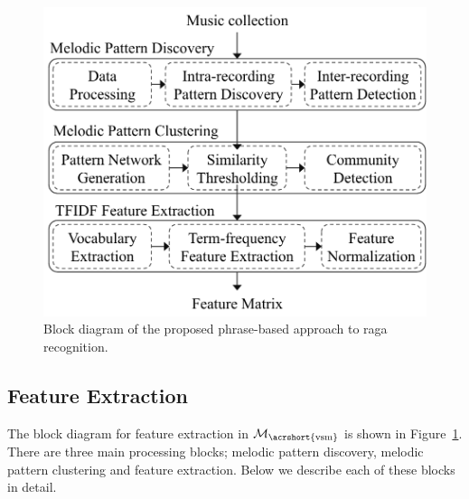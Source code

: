 
\begin{figure}
	\begin{center}
		\includegraphics[width=\figSizeSeventy]{ch07_ragaRecognition/figures/bd_phasebased_raga_recognition.pdf}
	\end{center}
	\caption{Block diagram of the proposed phrase-based approach to \gls{raga} recognition.}
	\label{fig:bd_phasebased_raga_recognition}
\end{figure}






\subsection{Feature Extraction}
\label{sec:vsm_feature_extraction}

The block diagram for feature extraction in $\mathcal{M}_\mathrm{\acrshort{vsm}}$ is shown in Figure~\ref{fig:bd_phasebased_raga_recognition}. There are three main processing blocks; melodic pattern discovery, melodic pattern clustering and feature extraction. Below we describe each of these blocks in detail. 

